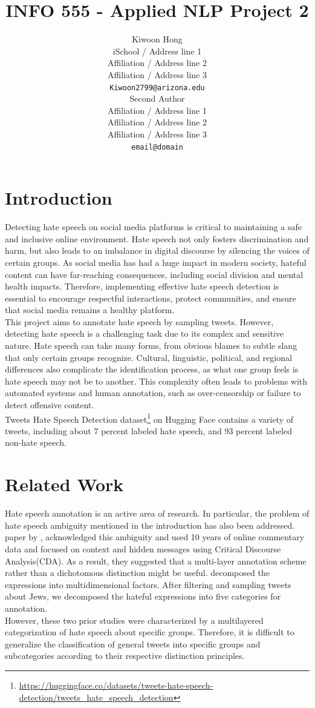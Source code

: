 \documentclass[11pt]{article}
\title{INFO 555 - Applied NLP Project 2}
\author{Kiwoon Hong \\
  iSchool / Address line 1 \\
  Affiliation / Address line 2 \\
  Affiliation / Address line 3 \\
  \texttt{Kiwoon2799@arizona.edu} \\\And
  Second Author \\
  Affiliation / Address line 1 \\
  Affiliation / Address line 2 \\
  Affiliation / Address line 3 \\
  \texttt{email@domain} \\}
\begin{document}
\maketitle


\section{Introduction}

Detecting hate speech on social media platforms is critical to maintaining a safe and inclusive online environment. Hate speech not only fosters discrimination and harm, but also leads to an imbalance in digital discourse by silencing the voices of certain groups. As social media has had a huge impact in modern society, hateful content can have far-reaching consequences, including social division and mental health impacts. Therefore, implementing effective hate speech detection is essential to encourage respectful interactions, protect communities, and ensure that social media remains a healthy platform.\\
This project aims to annotate hate speech by sampling tweets. However, detecting hate speech is a challenging task due to its complex and sensitive nature. Hate speech can take many forms, from obvious blames to subtle slang that only certain groups recognize. Cultural, linguistic, political, and regional differences also complicate the identification process, as what one group feels is hate speech may not be to another. This complexity often leads to problems with automated systems and human annotation, such as over-censorship or failure to detect offensive content. \\
Tweets Hate Speech Detection dataset\footnote{\url{https://huggingface.co/datasets/tweets-hate-speech-detection/tweets_hate_speech_detection}} on Hugging Face contains a variety of tweets, including about 7 percent labeled hate speech, and 93 percent labeled non-hate speech.


\section{Related Work}

Hate speech annotation is an active area of research. In particular, the problem of hate speech ambiguity mentioned in the introduction has also been addressed. paper by \citet{assimakopoulos-etal-2020-annotating}, acknowledged this ambiguity and used 10 years of online commentary data and focused on context and hidden messages using Critical Discourse Analysis(CDA). As a result, they suggested that a multi-layer annotation scheme rather than a dichotomous distinction might be useful. \citet{ron-etal-2023-factoring} decomposed the expressions into multidimensional factors. After filtering and sampling tweets about Jews, we decomposed the hateful expressions into five categories for annotation. \\ However, these two prior studies were characterized by a multilayered categorization of hate speech about specific groups. Therefore, it is difficult to generalize the classification of general tweets into specific groups and subcategories according to their respective distinction principles. 
\end{document}
